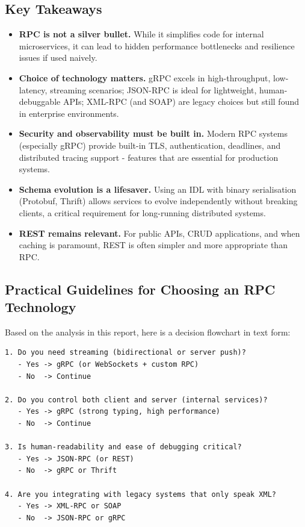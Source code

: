 \documentclass[10pt,a4paper]{article}
\begin{document}
\subsection{Key Takeaways}
\begin{itemize}
    \item \textbf{RPC is not a silver bullet.} While it simplifies code for internal microservices, it can lead to hidden performance bottlenecks and resilience issues if used naively.
    \item \textbf{Choice of technology matters.} gRPC excels in high-throughput, low-latency, streaming scenarios; JSON-RPC is ideal for lightweight, human-debuggable APIs; XML-RPC (and SOAP) are legacy choices but still found in enterprise environments.
    \item \textbf{Security and observability must be built in.} Modern RPC systems (especially gRPC) provide built-in TLS, authentication, deadlines, and distributed tracing support - features that are essential for production systems.
    \item \textbf{Schema evolution is a lifesaver.} Using an IDL with binary serialisation (Protobuf, Thrift) allows services to evolve independently without breaking clients, a critical requirement for long-running distributed systems.
    \item \textbf{REST remains relevant.} For public APIs, CRUD applications, and when caching is paramount, REST is often simpler and more appropriate than RPC.
\end{itemize}
\subsection{Practical Guidelines for Choosing an RPC Technology}
Based on the analysis in this report, here is a decision flowchart in text form:

\begin{verbatim}
1. Do you need streaming (bidirectional or server push)?
   - Yes -> gRPC (or WebSockets + custom RPC)
   - No  -> Continue

2. Do you control both client and server (internal services)?
   - Yes -> gRPC (strong typing, high performance)
   - No  -> Continue

3. Is human-readability and ease of debugging critical?
   - Yes -> JSON-RPC (or REST)
   - No  -> gRPC or Thrift

4. Are you integrating with legacy systems that only speak XML?
   - Yes -> XML-RPC or SOAP
   - No  -> JSON-RPC or gRPC
\end{verbatim}
\end{document}

